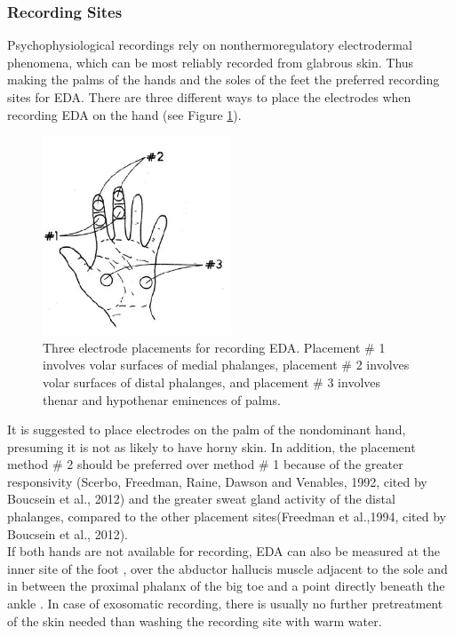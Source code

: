\subsubsection*{Recording Sites}
Psychophysiological recordings rely on nonthermoregulatory electrodermal phenomena, which can be most reliably recorded from glabrous skin. Thus making the palms of the hands and the soles of the feet the preferred recording sites for EDA. There are three different ways to place the electrodes when recording EDA on the hand (see Figure \ref{PalmImg}).

\begin{figure}[ht]
\centering
\includegraphics[width=0.5\textwidth]{images/electrodePlacement.png}
\caption{Three electrode placements for recording EDA. Placement \# 1 involves volar surfaces of medial phalanges, placement \# 2 involves volar surfaces of distal phalanges, and placement \# 3 involves thenar and hypothenar eminences of palms.\citep{HANDBOOKPP}}
\label{PalmImg}
\end{figure}

It is suggested to place electrodes on the palm of the nondominant hand, presuming it is not as likely to have horny skin. In addition, the placement method \# 2 should be preferred over method \# 1 because of the greater responsivity (Scerbo, Freedman, Raine, Dawson and Venables, 1992, cited by Boucsein et al., 2012) and the greater sweat gland activity of the distal phalanges, compared to the other placement sites(Freedman et al.,1994, cited by Boucsein et al., 2012).\\
If both hands are not available for recording, EDA can also be measured at the inner site of the foot , over the abductor hallucis muscle adjacent to the sole and in between the proximal phalanx of the big toe and a point directly beneath the ankle \citep{boucsein2012electrodermal}. In case of exosomatic recording, there is usually no further pretreatment of the skin needed than washing the recording site with warm water.

